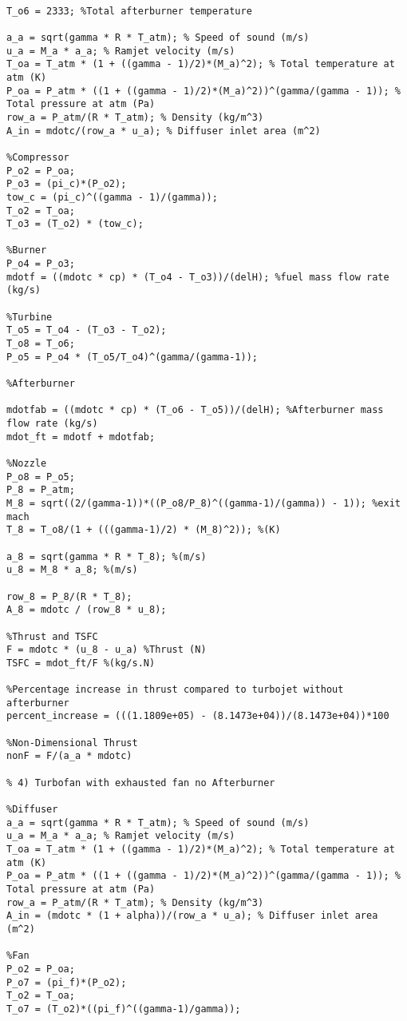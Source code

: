 \documentclass[]{article}
\theoremstyle{definition}
\begin{document}
\begin{lstlisting}[style=Matlab-editor]
% 3) Turbojet with afterburner

T_o6 = 2333; %Total afterburner temperature

a_a = sqrt(gamma * R * T_atm); % Speed of sound (m/s)
u_a = M_a * a_a; % Ramjet velocity (m/s)
T_oa = T_atm * (1 + ((gamma - 1)/2)*(M_a)^2); % Total temperature at atm (K)
P_oa = P_atm * ((1 + ((gamma - 1)/2)*(M_a)^2))^(gamma/(gamma - 1)); % Total pressure at atm (Pa)
row_a = P_atm/(R * T_atm); % Density (kg/m^3)
A_in = mdotc/(row_a * u_a); % Diffuser inlet area (m^2)

%Compressor
P_o2 = P_oa;
P_o3 = (pi_c)*(P_o2);
tow_c = (pi_c)^((gamma - 1)/(gamma));
T_o2 = T_oa;
T_o3 = (T_o2) * (tow_c);

%Burner
P_o4 = P_o3;
mdotf = ((mdotc * cp) * (T_o4 - T_o3))/(delH); %fuel mass flow rate (kg/s)

%Turbine
T_o5 = T_o4 - (T_o3 - T_o2);
T_o8 = T_o6;
P_o5 = P_o4 * (T_o5/T_o4)^(gamma/(gamma-1));

%Afterburner

mdotfab = ((mdotc * cp) * (T_o6 - T_o5))/(delH); %Afterburner mass flow rate (kg/s)
mdot_ft = mdotf + mdotfab;

%Nozzle
P_o8 = P_o5;
P_8 = P_atm;
M_8 = sqrt((2/(gamma-1))*((P_o8/P_8)^((gamma-1)/(gamma)) - 1)); %exit mach
T_8 = T_o8/(1 + (((gamma-1)/2) * (M_8)^2)); %(K)

a_8 = sqrt(gamma * R * T_8); %(m/s)
u_8 = M_8 * a_8; %(m/s)

row_8 = P_8/(R * T_8);
A_8 = mdotc / (row_8 * u_8);

%Thrust and TSFC
F = mdotc * (u_8 - u_a) %Thrust (N)
TSFC = mdot_ft/F %(kg/s.N)

%Percentage increase in thrust compared to turbojet without afterburner
percent_increase = (((1.1809e+05) - (8.1473e+04))/(8.1473e+04))*100

%Non-Dimensional Thrust
nonF = F/(a_a * mdotc)

% 4) Turbofan with exhausted fan no Afterburner

%Diffuser
a_a = sqrt(gamma * R * T_atm); % Speed of sound (m/s)
u_a = M_a * a_a; % Ramjet velocity (m/s)
T_oa = T_atm * (1 + ((gamma - 1)/2)*(M_a)^2); % Total temperature at atm (K)
P_oa = P_atm * ((1 + ((gamma - 1)/2)*(M_a)^2))^(gamma/(gamma - 1)); % Total pressure at atm (Pa)
row_a = P_atm/(R * T_atm); % Density (kg/m^3)
A_in = (mdotc * (1 + alpha))/(row_a * u_a); % Diffuser inlet area (m^2)

%Fan
P_o2 = P_oa;
P_o7 = (pi_f)*(P_o2);
T_o2 = T_oa;
T_o7 = (T_o2)*((pi_f)^((gamma-1)/gamma));


\end{lstlisting}
\end{document}
